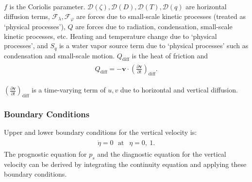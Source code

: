 \(f\) is the Coriolis parameter. \({\mathcal D}(\zeta), {\mathcal D}(D), {\mathcal D}(T), {\mathcal D}(q)\) are horizontal diffusion terms, \({\mathcal F}_\lambda, {\mathcal F}_\varphi\) are forces
due to small-scale kinetic processes (treated as `physical processes'), \(Q\) are forces due to radiation, condensation, small-scale kinetic processes, etc. Heating and temperature change due to
`physical processes', and \(S_q\) is a water vapor source term due to `physical processes' such as condensation and small-scale motion. \(Q_{\mathrm{diff}}\) is the heat of friction and
\begin{eqnarray}\begin{aligned}
  Q_{\mathrm{diff}}
 = - {\mathbf{v}} \cdot  \left( \frac{\partial {\mathbf{v}}}{\partial t} \right)_{\mathrm{diff}} .\end{aligned}\end{eqnarray}

\(( \frac{\partial {\mathbf{v}}}{\partial t} )_{\mathrm{diff}}\) is a time-varying term of \(u,v\) due to horizontal and vertical diffusion.

\hypertarget{boundary-conditions}{%
\subsubsection{Boundary Conditions}\label{boundary-conditions}}

Upper and lower boundary conditions for the vertical velocity is: \begin{eqnarray}\begin{aligned}
  \dot{\eta} = 0  \ \ \ \text{at~} \ \ \eta = 0 , \ 1 .\end{aligned}\end{eqnarray} The prognostic equation for \(p_s\) and the diagnostic equation for the vertical velocity can be derived by integrating the
continuity equation and applying these boundary conditions.
